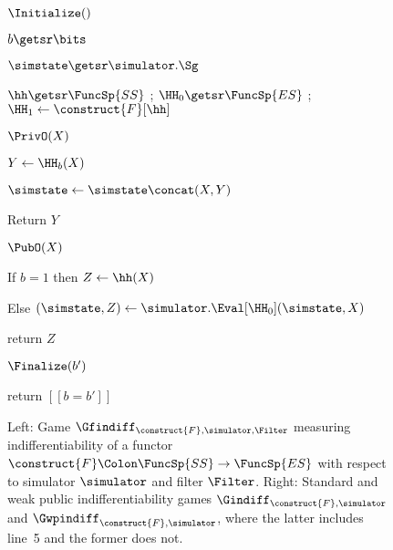 \begin{figure}[t]
{	\begin{algorithm-initial}{$\Initialize()$}
		\item $b \getsr \bits$
		\item $\simstate \getsr \simulator.\Sg$
		\item $\hh \getsr \FuncSp{SS}$
		; $\HH_0 \getsr \FuncSp{ES}$ ; $\HH_1 \gets \construct{F}[\hh]$
	\end{algorithm-initial}
	\begin{algorithm-subsequent}{$\PrivO(X)$}
		\item $Y \gets \HH_b(X)$
		\item $\simstate\gets\simstate \concat (X, Y)$ 
		\item Return $Y$
	\end{algorithm-subsequent}
	\ExptSepSpace
	\begin{algorithm-subsequent}{$\PubO(X)$}
		\item If $b=1$ then $Z\gets \hh(X)$
		\item Else $(\simstate,Z) \gets \simulator.\Eval[\HH_0] (\simstate,X)$
		\item return $Z$
	\end{algorithm-subsequent}
		\ExptSepSpace
	\begin{algorithm-subsequent}{$\Finalize(b')$}
		\item return $[[b = b']]$
	\end{algorithm-subsequent}
}
	\vspace{-5pt}
	\caption{Left: Game  $\Gfindiff_{\construct{F},  \simulator, \Filter}$ measuring indifferentiability of a functor $\construct{F}\Colon \FuncSp{SS}\to\FuncSp{ES}$ with respect to simulator $\simulator$ and filter $\Filter$. Right: Standard and weak public indifferentiability games $\Gindiff_{\construct{F},  \simulator}$ and $\Gwpindiff_{\construct{F},  \simulator}$, where the latter includes line~5 and the former does not.
	}
	\label{fig-gm-indiff}
	\hrulefill
\end{figure}



